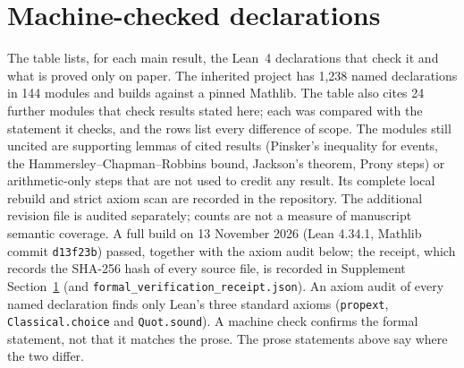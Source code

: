 \documentclass[12pt]{article}
\theoremstyle{definition}
\theoremstyle{remark}
\begin{document}
\section{Machine-checked declarations}\label{app:verification}

The table lists, for each main result, the Lean~4 declarations that check it and what is proved only on paper. The inherited project has 1,238 named declarations in 144 modules and builds against a pinned Mathlib. The table also cites 24 further modules that check results stated here; each was compared with the statement it checks, and the rows list every difference of scope. The modules still uncited are supporting lemmas of cited results (Pinsker's inequality for events, the Hammersley--Chapman--Robbins bound, Jackson's theorem, Prony steps) or arithmetic-only steps that are not used to credit any result. Its complete local rebuild and strict axiom scan are recorded in the repository. The additional revision file is audited separately; counts are not a measure of manuscript semantic coverage. A full build on 13 November 2026 (Lean 4.34.1, Mathlib commit \texttt{d13f23b}) passed, together with the axiom audit below; the receipt, which records the SHA-256 hash of every source file, is recorded in Supplement Section~\ref{app:verification} (and \nolinkurl{formal_verification_receipt.json}). An axiom audit of every named declaration finds only Lean's three standard axioms (\texttt{propext}, \texttt{Classical.choice} and \texttt{Quot.sound}). A machine check confirms the formal statement, not that it matches the prose. The prose statements above say where the two differ.
\end{document}
